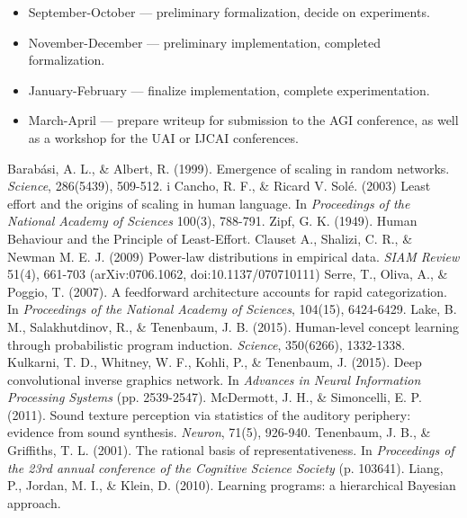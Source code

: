 \documentclass[11pt,letterpaper]{article}
\begin{document}
\begin{itemize}
  \item September-October --- preliminary formalization, decide on
    experiments.
  \item November-December --- preliminary implementation, completed
    formalization.
  \item January-February --- finalize implementation, complete
    experimentation.
  \item March-April --- prepare writeup for submission to the AGI
    conference, as well as a workshop for the UAI or IJCAI conferences.
\end{itemize}


\begin{thebibliography}{}
    Barab\'asi, A. L., \& Albert, R. (1999).
    Emergence of scaling in random networks.
    \emph{Science}, 286(5439), 509-512.
   i Cancho, R. F., \& Ricard V. Solé. (2003)
    Least effort and the origins of scaling in human language.
    In \emph{Proceedings of the National Academy of Sciences} 100(3), 788-791.
   Zipf, G. K. (1949).
    Human Behaviour and the Principle of Least-Effort.
   Clauset A., Shalizi, C. R., \& Newman M. E. J.  (2009)
    Power-law distributions in empirical data.
    \emph{SIAM Review} 51(4), 661-703 (arXiv:0706.1062, doi:10.1137/070710111)
    Serre, T., Oliva, A., \& Poggio, T. (2007).
    A feedforward architecture accounts for rapid categorization.
    In \emph{Proceedings of the National Academy of Sciences}, 104(15), 6424-6429.
   Lake, B. M., Salakhutdinov, R., \& Tenenbaum, J. B. (2015).
    Human-level concept learning through probabilistic program induction.
    \emph{Science}, 350(6266), 1332-1338.
    Kulkarni, T. D., Whitney, W. F., Kohli, P., \& Tenenbaum, J. (2015).
    Deep convolutional inverse graphics network.
    In \emph{Advances in Neural Information Processing Systems} (pp. 2539-2547).
    McDermott, J. H., \& Simoncelli, E. P. (2011).
    Sound texture perception via statistics of the auditory periphery:
    evidence from sound synthesis.
    \emph{Neuron}, 71(5), 926-940.
    Tenenbaum, J. B., \& Griffiths, T. L. (2001).
    The rational basis of representativeness.
    In \emph{Proceedings of the 23rd annual conference of the Cognitive
    Science Society} (p. 103641).
    Liang, P., Jordan, M. I., \& Klein, D. (2010).
    Learning programs: a hierarchical Bayesian approach.

\end{thebibliography}
\end{document}
